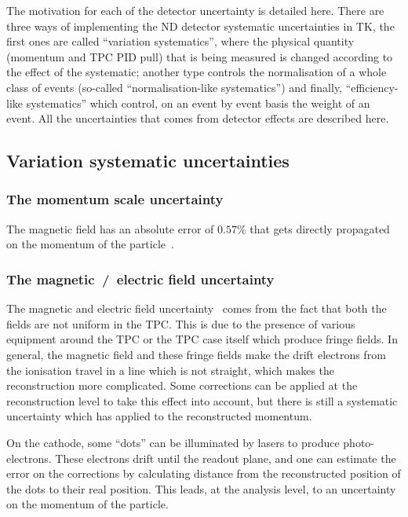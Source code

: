 
The motivation for each of the detector uncertainty is detailed here.
There are three ways of implementing the \Gls{ND} detector systematic
uncertainties in \Gls{TK}, the first ones are called ``variation
systematics'', where the physical quantity (momentum and \Gls{TPC}
\Gls{PID} pull) that is being measured is changed according to the
effect of the systematic; another type controls the normalisation of a
whole class of events (so-called ``normalisation-like systematics'')
and finally, ``efficiency-like systematics'' which control, on an
event by event basis the weight of an event. All the uncertainties
that comes from detector effects are described here.

\subsection{Variation systematic uncertainties}

\subsubsection{The momentum scale uncertainty}
\label{subsec:momscale}
The magnetic field has an absolute error of $0.57\%$ that gets
directly propagated on the momentum of the particle~\cite{TN212}.

\subsubsection{The magnetic~/~electric field uncertainty}
\label{subsubsec:bfield}
The magnetic and electric field uncertainty~\cite{TN212} comes from
the fact that both the fields are not uniform in the \Gls{TPC}. This
is due to the presence of various equipment around the \Gls{TPC} or
the \Gls{TPC} case itself which produce fringe fields. In general, the
magnetic field and these fringe fields make the drift electrons from
the ionisation travel in a line which is not straight, which makes the
reconstruction more complicated. Some corrections can be applied at
the reconstruction level to take this effect into account, but there
is still a systematic uncertainty which has applied to the
reconstructed momentum.

On the cathode, some ``dots'' can be illuminated by lasers to produce
photo-electrons. These electrons drift until the readout plane, and
one can estimate the error on the corrections by calculating distance
from the reconstructed position of the dots to their real position.
This leads, at the analysis level, to an uncertainty on the momentum
of the particle.

